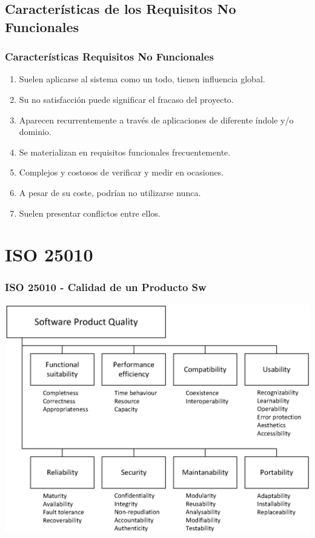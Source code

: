 \documentclass[handout,a4paper,slidestop,xcolor=pst,dvips,blue]{beamer}
\begin{document}
\subsection{Características de los Requisitos No Funcionales}

\begin{frame}[c]
    \frametitle{Características Requisitos No Funcionales}
    \begin{enumerate}[<+->]
        \item Suelen aplicarse al sistema como un todo, tienen influencia global.
        \item Su no satisfacción puede significar el fracaso del proyecto.
        \item Aparecen recurrentemente a través de aplicaciones de diferente índole y/o dominio.
        \item Se materializan en requisitos funcionales frecuentemente.
        \item Complejos y costosos de verificar y medir en ocasiones.
        \item A pesar de su coste, podrían no utilizarse nunca.
        \item Suelen presentar conflictos entre ellos.
    \end{enumerate}
\end{frame}

\section{ISO 25010}

\begin{frame}[c]
    \frametitle{ISO 25010 - Calidad de un Producto Sw}
    \begin{center}
        \includegraphics[width=0.85\linewidth]{images/iso25010/iso25010.eps}
    \end{center}
\end{frame}
\end{document}
